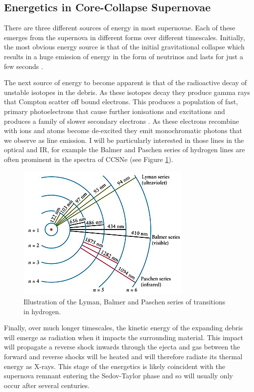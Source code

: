  
 \subsection{Energetics in Core-Collapse Supernovae}

There are three different sources of energy in most supernovae.  Each of these emerges from the supernova in different forms over different timescales.  Initially, the most obvious energy source is that of the initial gravitational collapse which results in a huge emission of energy in the form of neutrinos and lasts for just a few seconds \citep{Kotake2006}.  

The next source of energy to become apparent is that of the radioactive decay of unstable isotopes in the debris.  As these isotopes decay they produce gamma rays that Compton scatter off bound electrons.  This produces a population of fast, primary photoelectrons that cause further ionisations and excitations and produces a family of slower secondary electrons \citep{Fransson1986}.  As these electrons recombine with ions and atoms become de-excited they emit monochromatic photons that we observe as line emission.  I will be particularly interested in those lines in the optical and IR, for example the Balmer and Paschen series of hydrogen lines are often prominent in the spectra of CCSNe (see Figure \ref{fig:balmer}).

 \begin{figure}
\centering
\includegraphics[clip=true,scale=0.9,trim= 0 0 0 0]{chapters/chapter1/figs/balmer1.jpg}
\caption{Illustration of the Lyman, Balmer and Paschen series of transitions in hydrogen.}
\label{fig:balmer}
\end{figure}


Finally, over much longer timescales, the kinetic energy of the expanding debris will emerge as radiation when it impacts the surrounding material.  This impact will propagate a reverse shock inwards through the ejecta and gas between the forward and reverse shocks will be heated and will therefore radiate its thermal energy as X-rays.  This stage of the energetics is likely coincident with the supernova remnant entering the Sedov-Taylor phase and so will usually only occur after several centuries.  

